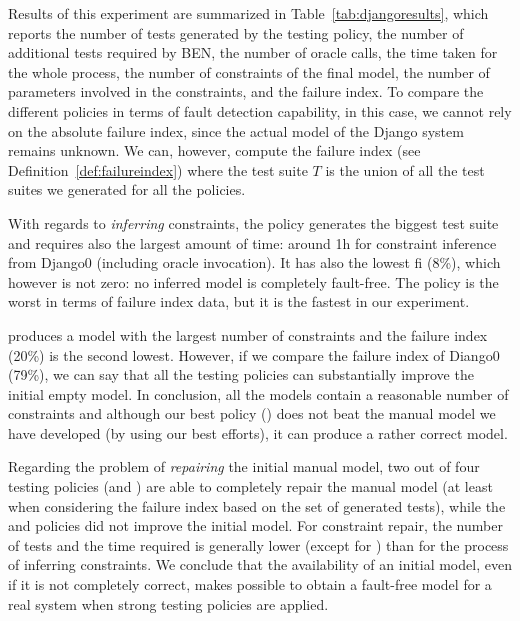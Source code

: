 \begin{tikzborder}{\cite{Gargantini16:validation}}
\begin{tikzborder}{\cite{gargantini_combinatorial_2017}}
\bb Results of this experiment are summarized in Table~\ref{tab:djangoresults}, which reports the number of tests generated by the testing policy, the number of additional tests required by BEN, the number of oracle calls, the time taken for the whole process, the number of constraints of the final model, the number of parameters involved in the constraints, and the failure index. 
To compare the different policies in terms of fault detection capability, in this case, we cannot rely on the absolute failure index, since the actual model of the Django system remains unknown. We can, however, compute the failure index (see Definition~\ref{def:failureindex}) %
where the test suite $T$ is the union of all the test suites we generated for all the policies. 


With regards to \emph{inferring} constraints,  the \cucv policy generates the biggest test suite and requires also the largest amount of time: around 1h for constraint inference from {\sf Django0} (including oracle invocation). It has also the lowest {\sf fi} (8\%), which however is not zero: no inferred model is completely fault-free. The \ic policy is the worst in terms of failure index data, but it is the fastest in our experiment.

\noindent \ValC produces a model with the largest number of constraints and the failure index (20\%) is the second lowest. %
However, if we compare the failure index of Diango0 (79\%), we can say that all the testing policies can substantially improve the initial empty model. In conclusion, all the models contain a reasonable number of constraints and although our best policy (\cucv) does not beat the manual model we have developed (by using our best efforts), it can produce a rather correct model.  

Regarding the problem of \emph{repairing}  the initial manual model, two out of four testing policies (\cucv and \ValC) are able to completely repair the manual model (at least when considering the failure index based on the set of generated tests), while the \ic and \ccit policies did not improve the initial model.  For constraint repair, the number of tests and the time required is generally lower (except for \ic) than for the process of inferring constraints. We conclude that the availability of an initial model, even if it is not completely correct, makes possible to obtain a fault-free model for a real system when strong testing policies are applied.


\end{tikzborder}
\end{tikzborder}
